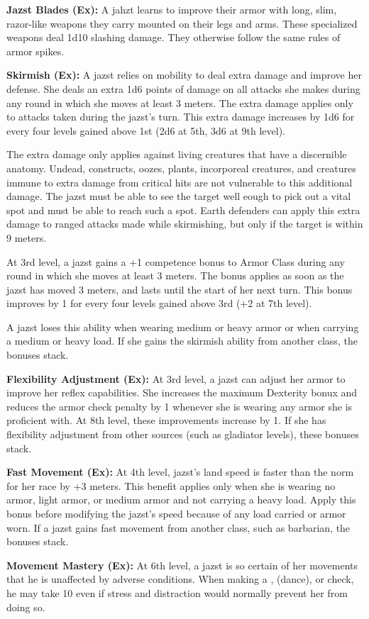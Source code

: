 {\textbf{Jazst Blades (Ex):} A jahzt learns to improve their armor with long, slim, razor-like weapons they carry mounted on their legs and arms. These specialized weapons deal 1d10 slashing damage. They otherwise follow the same rules of armor spikes. 

\textbf{Skirmish (Ex):} A jazst relies on mobility to deal extra damage and improve her defense. She deals an extra 1d6 points of damage on all attacks she makes during any round in which she moves at least 3 meters. The extra damage applies only to attacks taken during the jazst's turn. This extra damage increases by 1d6 for every four levels gained above 1st (2d6 at 5th, 3d6 at 9th level).

The extra damage only applies against living creatures that have a discernible anatomy. Undead, constructs, oozes, plants, incorporeal creatures, and creatures immune to extra damage from critical hits are not vulnerable to this additional damage. The jazst must be able to see the target well eough to pick out a vital spot and must be able to reach such a spot. Earth defenders can apply this extra damage to ranged attacks made while skirmishing, but only if the target is within 9 meters.

At 3rd level, a jazst gains a +1 competence bonus to Armor Class during any round in which she moves at least 3 meters. The bonus applies as soon as the jazst has moved 3 meters, and lasts until the start of her next turn. This bonus improves by 1 for every four levels gained above 3rd (+2 at 7th level).

A jazst loses this ability when wearing medium or heavy armor or when carrying a medium or heavy load. If she gains the skirmish ability from another class, the bonuses stack.

\textbf{Flexibility Adjustment (Ex):} At 3rd level, a jazst can adjust her armor to improve her reflex capabilities. She increases the maximum Dexterity bonux and reduces the armor check penalty by 1 whenever she is wearing any armor she is proficient with. At 8th level, these improvements increase by 1. If she has flexibility adjustment from other sources (such as gladiator levels), these bonuses stack.

\textbf{Fast Movement (Ex):} At 4th level, jazst's land speed is faster than the norm for her race by +3 meters. This benefit applies only when she is wearing no armor, light armor, or medium armor and not carrying a heavy load. Apply this bonus before modifying the jazst's speed because of any load carried or armor worn. If a jazst gains fast movement from another class, such as barbarian, the bonuses stack.

\textbf{Movement Mastery (Ex):} At 6th level, a jazst is so certain of her movements that he is unaffected by adverse conditions. When making a ,  (dance), or  check, he may take 10 even if stress and distraction would normally prevent her from doing so.

}